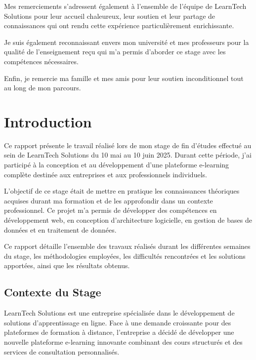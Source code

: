 \documentclass[12pt, a4paper]{report}
\begin{document}
Mes remerciements s'adressent également à l'ensemble de l'équipe de LearnTech Solutions pour leur accueil chaleureux, leur soutien et leur partage de connaissances qui ont rendu cette expérience particulièrement enrichissante.

Je suis également reconnaissant envers mon université et mes professeurs pour la qualité de l'enseignement reçu qui m'a permis d'aborder ce stage avec les compétences nécessaires.

Enfin, je remercie ma famille et mes amis pour leur soutien inconditionnel tout au long de mon parcours.

\newpage

\tableofcontents
\thispagestyle{fancy}
\newpage

\chapter{Introduction}
\thispagestyle{fancy}

Ce rapport présente le travail réalisé lors de mon stage de fin d'études effectué au sein de LearnTech Solutions du 10 mai au 10 juin 2025. Durant cette période, j'ai participé à la conception et au développement d'une plateforme e-learning complète destinée aux entreprises et aux professionnels individuels.

L'objectif de ce stage était de mettre en pratique les connaissances théoriques acquises durant ma formation et de les approfondir dans un contexte professionnel. Ce projet m'a permis de développer des compétences en développement web, en conception d'architecture logicielle, en gestion de bases de données et en traitement de données.

Ce rapport détaille l'ensemble des travaux réalisés durant les différentes semaines du stage, les méthodologies employées, les difficultés rencontrées et les solutions apportées, ainsi que les résultats obtenus.

\section{Contexte du Stage}
LearnTech Solutions est une entreprise spécialisée dans le développement de solutions d'apprentissage en ligne. Face à une demande croissante pour des plateformes de formation à distance, l'entreprise a décidé de développer une nouvelle plateforme e-learning innovante combinant des cours structurés et des services de consultation personnalisés.
\end{document}
